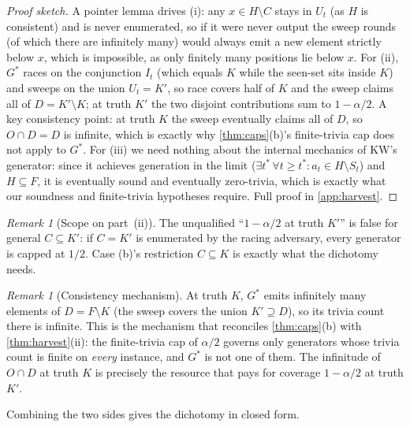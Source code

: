 \documentclass[11pt]{article}
\numberwithin{equation}{section}
\newcommand{\Amb}{F}
\newcommand{\Val}{H}
\newcommand{\Seen}{S}
\newcommand{\Out}{O}
\newcommand{\Core}{C}
\theoremstyle{plain}
\theoremstyle{definition}
\theoremstyle{remark}
\newtheorem{remark}[theorem]{Remark}
\begin{document}
\begin{proof}[Proof sketch]
A pointer lemma drives (i): any $x \in \Val \setminus \Core$ stays in $U_t$ (as $\Val$ is
consistent) and is never enumerated, so if it were never output the sweep rounds (of which
there are infinitely many) would always emit a new element strictly below $x$, which is
impossible, as only finitely many positions lie below $x$. For (ii), $G^*$ races on the
conjunction $I_t$ (which equals $K$ while the seen-set sits inside $K$) and sweeps on the
union $U_t = K'$, so race covers half of $K$ and the sweep claims all of $D = K' \setminus K$;
at truth $K'$ the two disjoint contributions sum to $1 - \alpha/2$. A key consistency point:
at truth $K$ the sweep eventually claims all of $D$, so $\Out \cap D = D$ is infinite, which
is exactly why \cref{thm:caps}(b)'s finite-trivia cap does not apply to $G^*$. For (iii) we
need nothing about the internal mechanics of KW's generator: since it achieves generation in
the limit ($\exists t^*\,\forall t \ge t^*: a_t \in \Val \setminus \Seen_t$) and $\Val
\subseteq \Amb$, it is eventually sound and eventually zero-trivia, which is exactly what our
soundness and finite-trivia hypotheses require. Full proof in \cref{app:harvest}.
\end{proof}

\begin{remark}[Scope on part~(ii)] The unqualified ``$1 - \alpha/2$ at truth $K'$'' is
false for general $\Core \subseteq K'$: if $\Core = K'$ is enumerated by the racing adversary,
every generator is capped at $1/2$. Case (b)'s restriction $\Core \subseteq K$ is exactly what
the dichotomy needs.
\end{remark}

\begin{remark}[Consistency mechanism]\label{rmk:consistency}
At truth $K$, $G^*$ emits infinitely many elements of $D = \Amb \setminus K$ (the sweep covers
the union $K' \supseteq D$), so its trivia count there is infinite. This is the mechanism that
reconciles \cref{thm:caps}(b) with \cref{thm:harvest}(ii): the finite-trivia cap of $\alpha/2$
governs only generators whose trivia count is finite on \emph{every} instance, and $G^*$ is
not one of them. The infinitude of $\Out \cap D$ at truth $K$ is precisely the resource that
pays for coverage $1 - \alpha/2$ at truth $K'$.
\end{remark}

Combining the two sides gives the dichotomy in closed form.
\end{document}
